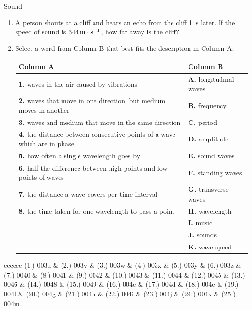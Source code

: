 \begin{eocexercises}{Sound}
\begin{enumerate}[noitemsep, label=\textbf{\arabic*}. ]
\label{m38783*uid44}\item A person shouts at a cliff and hears an echo from the cliff 1~s later. If the speed of sound is $344\phantom{\rule{2pt}{0ex}}\text{m}\ensuremath{\cdot}\text{s}{}^{-1}$, how far away is the cliff?\newline
\label{m38783*uid37}\item Select a word from Column B that best fits the description in Column A:
          \begin{center}
\begin{tabular}{|p{8cm}|l|}\hline
\textbf{Column A} & \textbf{Column B} \\ \hline
\textbf{1.} waves in the air caused by vibrations & \textbf{A.} longitudinal waves \\ \hline
\textbf{2.} waves that move in one direction, but medium moves in another & \textbf{B.} frequency \\ \hline
\textbf{3.} waves and medium that move in the same direction & \textbf{C.} period \\ \hline
\textbf{4.} the distance between consecutive points of a wave which are in phase & \textbf{D.} amplitude \\ \hline
\textbf{5.} how often a single wavelength goes by & \textbf{E.} sound waves \\ \hline
\textbf{6.} half the difference between high points and low points of waves & \textbf{F.} standing waves \\ \hline
\textbf{7.} the distance a wave covers per time interval & \textbf{G.} transverse waves \\ \hline
\textbf{8.} the time taken for one wavelength to pass a point & \textbf{H.} wavelength \\ \hline
& \textbf{I.} music \\ \hline
& \textbf{J.} sounds \\ \hline
& \textbf{K.} wave speed \\ \hline
\end{tabular}
\end{center}
\end{enumerate}
  \label{m38800**end}
  \label{9b5d72dd5f0585e544578ab90a9956a8**end}
\par \practiceinfo
 \par \begin{tabular}[h]{cccccc}
 (1.) 003u  &  (2.) 003v  &  (3.) 003w  &  (4.) 003x  &  (5.) 003y  &  (6.) 003z  &  (7.) 0040  &  (8.) 0041  &  (9.) 0042  &  (10.) 0043  &  (11.) 0044  &  (12.) 0045  &  (13.) 0046  &  %
  (14.) 0048  &  (15.) 0049  &  
(16.) 004c  &  
(17.) 004d  &  (18.) 004e  &  (19.) 004f  &  (20.) 004g  &  (21.) 004h  &  (22.) 004i  &  (23.) 004j  & (24.) 004k & (25.) 004m  \end{tabular}

\end{eocexercises}
